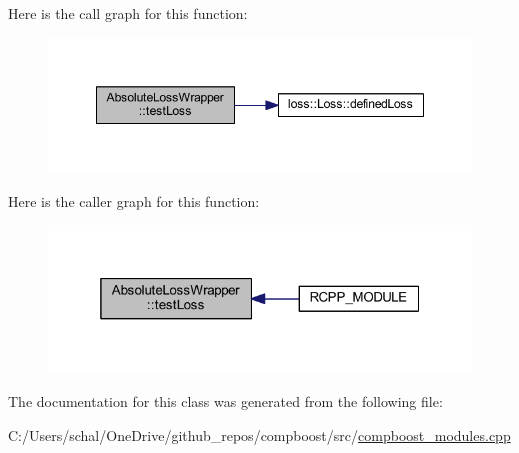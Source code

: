 Here is the call graph for this function\+:\nopagebreak
\begin{figure}[H]
\begin{center}
\leavevmode
\includegraphics[width=348pt]{class_absolute_loss_wrapper_a85a76340b719fa2af7cc9964c7e668ed_cgraph}
\end{center}
\end{figure}
Here is the caller graph for this function\+:\nopagebreak
\begin{figure}[H]
\begin{center}
\leavevmode
\includegraphics[width=319pt]{class_absolute_loss_wrapper_a85a76340b719fa2af7cc9964c7e668ed_icgraph}
\end{center}
\end{figure}


The documentation for this class was generated from the following file\+:\begin{DoxyCompactItemize}
\item 
C\+:/\+Users/schal/\+One\+Drive/github\+\_\+repos/compboost/src/\mbox{\hyperlink{compboost__modules_8cpp}{compboost\+\_\+modules.\+cpp}}\end{DoxyCompactItemize}
